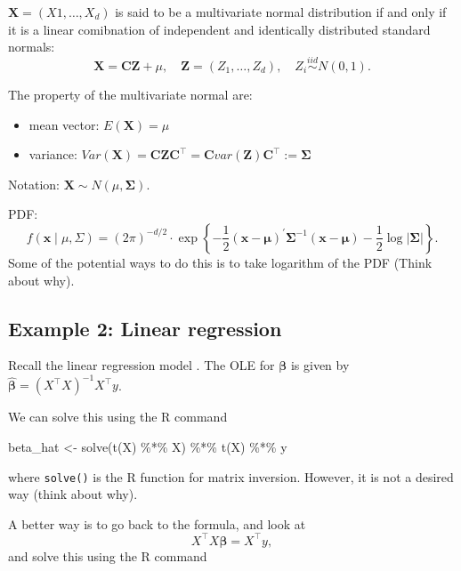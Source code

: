 \documentclass[
  letterpaper,
  DIV=11,
  numbers=noendperiod]{scrreprt}
\newenvironment{Shaded}{\begin{snugshade}}{\end{snugshade}}
\newcommand{\FunctionTok}[1]{\textcolor[rgb]{0.28,0.35,0.67}{#1}}
\newcommand{\NormalTok}[1]{\textcolor[rgb]{0.00,0.23,0.31}{#1}}
\newcommand{\OtherTok}[1]{\textcolor[rgb]{0.00,0.23,0.31}{#1}}
\newcommand{\SpecialCharTok}[1]{\textcolor[rgb]{0.37,0.37,0.37}{#1}}
\providecommand{\tightlist}{%
  \setlength{\itemsep}{0pt}\setlength{\parskip}{0pt}}
\begin{document}
\(\boldsymbol{X} = (X1,\dots, X_d)\) is said to be a multivariate normal
distribution if and only if it is a linear comibnation of independent
and identically distributed standard normals: \[
\boldsymbol{X} = \boldsymbol{CZ} + \mu,\quad \boldsymbol{Z}=(Z_1,\dots,Z_d),\quad Z_i \stackrel{iid}{\sim} N(0,1).
\]

The property of the multivariate normal are:

\begin{itemize}
\tightlist
\item
  mean vector: \(E(\boldsymbol{X}) = \mu\)
\item
  variance:
  \(Var(\boldsymbol{X}) = \boldsymbol{CZC}^\top = \boldsymbol{C} var(\boldsymbol{Z})\boldsymbol{C}^\top:=  \boldsymbol{\Sigma}\)
\end{itemize}

Notation: \(\boldsymbol{X} \sim N(\mu, \boldsymbol{\Sigma})\).

PDF: \[
f(\boldsymbol{x} \mid \mu, \Sigma)=(2 \pi)^{-d / 2} \cdot \exp \left\{-\frac{1}{2}(\boldsymbol{x}-\boldsymbol{\mu})^{\prime} \boldsymbol{\Sigma}^{-1}(\boldsymbol{x}-\boldsymbol{\mu})-\frac{1}{2} \log |\boldsymbol{\Sigma}|\right\}.
\] Some of the potential ways to do this is to take logarithm of the PDF
(Think about why).

\subsection{Example 2: Linear
regression}\label{example-2-linear-regression}

Recall the linear regression model . The OLE for \(\boldsymbol{\beta}\)
is given by \(\hat{\boldsymbol{\beta}}=(X^\top X)^{-1} X^\top y\).

We can solve this using the R command

\begin{Shaded}
\begin{Highlighting}[]
\NormalTok{beta\_hat }\OtherTok{\textless{}{-}} \FunctionTok{solve}\NormalTok{(}\FunctionTok{t}\NormalTok{(X) }\SpecialCharTok{\%*\%}\NormalTok{ X) }\SpecialCharTok{\%*\%} \FunctionTok{t}\NormalTok{(X) }\SpecialCharTok{\%*\%}\NormalTok{ y}
\end{Highlighting}
\end{Shaded}

where \texttt{solve()} is the R function for matrix inversion. However,
it is not a desired way (think about why).

A better way is to go back to the formula, and look at \[
X^\top X\boldsymbol{\beta}= X^\top y,
\] and solve this using the R command
\end{document}
